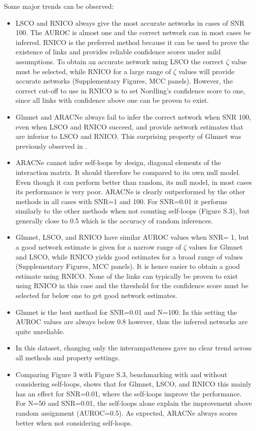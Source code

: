 Some major trends can be observed:
\begin{itemize}
\item LSCO and RNICO always give the most accurate networks in cases of SNR 100. The AUROC is almost one and the correct network can in most cases be inferred. RNICO is the preferred method because it can be used to prove the existence of links and provides reliable confidence scores under mild assumptions. To obtain an accurate network using LSCO the correct $\zeta$ value must be selected, while RNICO for a large range of $\zeta$ values will provide accurate networks (Supplementary Figures, MCC panels). However, the correct cut-off to use in RNICO is to set Nordling's confidence score to one, since all links with confidence above one can be proven to exist.

\item Glmnet and ARACNe always fail to infer the correct network when SNR 100, even when LSCO and RNICO succeed, and provide network estimates that are inferior to LSCO and RNICO. This surprising property of Glmnet was previously observed in \cite{Tjarnberg2014}.

\item ARACNe cannot infer self-loops by design, \ie diagonal elements of the interaction matrix. It should therefore be compared to its own null model. Even though it can perform better than random, \ie its null model, in most cases its performance is very poor. ARACNe is clearly outperformed by the other methods in all cases with SNR=1 and 100. For SNR=0.01 it performs similarly to the other methods when not counting self-loops (Figure S.3), but generally close to 0.5 which is the accuracy of random inferences.

\item Glmnet, LSCO, and RNICO have similar AUROC values when SNR= 1, but a good network estimate is given for a narrow range of $\zeta$ values for Glmnet and LSCO, while RNICO yields good estimates for a broad range of values (Supplementary Figures, MCC panels). It is hence easier to obtain a good estimate using RNICO. None of the links can typically be proven to exist using RNICO in this case and the threshold for the confidence score must be selected far below one to get good network estimates.

\item Glmnet is the best method for SNR=0.01 and N=100. In this setting the AUROC values are always below 0.8 however, thus the inferred networks are quite unreliable.

\item In this dataset, changing only the interampatteness gave no clear trend across all methods and property settings.

\item Comparing Figure 3 with Figure S.3, \ie benchmarking with and without considering self-loops, shows that for Glmnet, LSCO, and RNICO this mainly has an effect for SNR=0.01, where the self-loops improve the performance. For N=50 and SNR=0.01, the self-loops alone explain the improvement above random assignment (AUROC=0.5). As expected, ARACNe always scores better when not considering self-loops.

\end{itemize}
